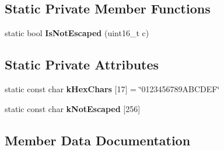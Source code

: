 \subsection*{Static Private Member Functions}
\begin{DoxyCompactItemize}
\item 
static bool {\bfseries Is\+Not\+Escaped} (uint16\+\_\+t c)\hypertarget{classv8_1_1internal_1_1_u_r_i_escape_a093b9833c0506386c020cd7d999fdd00}{}\label{classv8_1_1internal_1_1_u_r_i_escape_a093b9833c0506386c020cd7d999fdd00}

\end{DoxyCompactItemize}
\subsection*{Static Private Attributes}
\begin{DoxyCompactItemize}
\item 
static const char {\bfseries k\+Hex\+Chars} \mbox{[}17\mbox{]} = \char`\"{}0123456789\+A\+B\+C\+D\+E\+F\char`\"{}\hypertarget{classv8_1_1internal_1_1_u_r_i_escape_a9b7ddbc2fd75872c1a91d0748a25d166}{}\label{classv8_1_1internal_1_1_u_r_i_escape_a9b7ddbc2fd75872c1a91d0748a25d166}

\item 
static const char {\bfseries k\+Not\+Escaped} \mbox{[}256\mbox{]}
\end{DoxyCompactItemize}


\subsection{Member Data Documentation}
